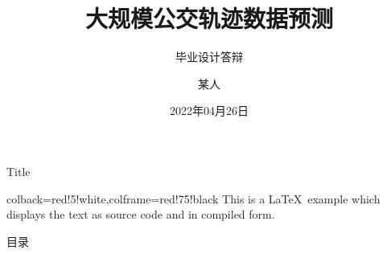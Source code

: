 \documentclass[aspectratio=169]{beamer}
\author{某人}
\title{大规模公交轨迹数据预测}
\subtitle{毕业设计答辩}
\institute{武汉大学计算机学院}
\date{2022年04月26日}
\begin{document}
\kaishu
\begin{frame}
    \titlepage
    
\end{frame}

\begin{frame}[fragile]{Title}
    \begin{tcblisting}{colback=red!5!white,colframe=red!75!black}
        This is a \LaTeX\ example which displays the text as source code
        and in compiled form.
    \end{tcblisting}
\end{frame}

\begin{frame}{目录}
                
        \transfade %
        \tableofcontents
\end{frame}









\end{document}
